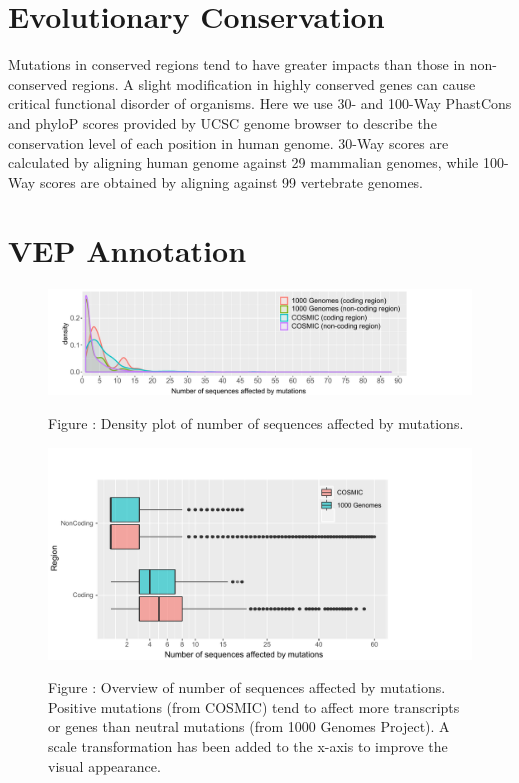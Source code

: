 \documentclass[a4paper,nohyper,nobib,openany,justified]{tufte-book}
\begin{document}
\begin{fullwidth}
\section{Evolutionary Conservation}

Mutations in conserved regions tend to have greater impacts than those in non-conserved regions. A slight modification in highly conserved genes can cause critical functional disorder of organisms. Here we use 30- and 100-Way PhastCons and phyloP scores provided by UCSC genome browser to describe the conservation level of each position in human genome. 30-Way scores are calculated by aligning human genome against 29 mammalian genomes, while 100-Way scores are obtained by aligning against 99 vertebrate genomes.

\section{VEP Annotation}

\begin{figure}[t]
  \includegraphics[width=\linewidth]{dist_vepNum.pdf}%

  \smallskip\noindent\small Figure \thefigure:
Density plot of number of sequences affected by mutations.
  \label{fig:dist_vepNum}%
\end{figure}

\begin{figure}[b!]
  \includegraphics[width=\linewidth]{vepNum.pdf}%

  \smallskip\noindent\small Figure \thefigure:
Overview of number of sequences affected by mutations. Positive mutations (from COSMIC) tend to affect more transcripts or genes than neutral mutations (from 1000 Genomes Project). A scale transformation has been added to the x-axis to improve the visual appearance.
  \label{fig:vepNum}%
\end{figure}


\end{fullwidth}
\end{document}
